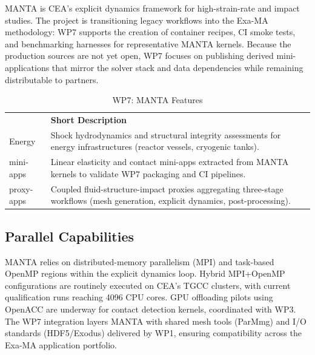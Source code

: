 MANTA is CEA's explicit dynamics framework for high-strain-rate and impact studies. The project is transitioning legacy
workflows into the Exa-MA methodology: WP7 supports the creation of container recipes, CI smoke tests, and benchmarking harnesses
for representative MANTA kernels. Because the production sources are not yet open, WP7 focuses on publishing derived
mini-applications that mirror the solver stack and data dependencies while remaining distributable to partners.

\begin{table}[h!]
    \centering
    { 
        \setlength{\parindent}{0pt}
        \def\arraystretch{1.25}
        {
            \fontsize{9}{11}\selectfont
            \begin{tabular}{!{\color{numpexgray}\vrule}p{.25\linewidth}!{\color{numpexgray}\vrule}p{.6885\linewidth}!{\color{numpexgray}\vrule}}
    
     &  {\rule{0pt}{2.5ex}\color{white}\bf Short Description }\\ 
    
    Energy & Shock hydrodynamics and structural integrity assessments for energy infrastructures (reactor vessels, cryogenic tanks). \\
    mini-apps & Linear elasticity and contact mini-apps extracted from MANTA kernels to validate WP7 packaging and CI pipelines. \\
    proxy-apps & Coupled fluid-structure-impact proxies aggregating three-stage workflows (mesh generation, explicit dynamics, post-processing). \\
\end{tabular}
        }
    }
    \caption{WP7: MANTA Features}
\end{table}


\subsection{Parallel Capabilities}
\label{sec:WP7:MANTA:performances}


MANTA relies on distributed-memory parallelism (MPI) and task-based OpenMP regions within the explicit dynamics loop. Hybrid
MPI+OpenMP configurations are routinely executed on CEA's TGCC clusters, with current qualification runs reaching 4096 CPU cores.
GPU offloading pilots using OpenACC are underway for contact detection kernels, coordinated with WP3. The WP7 integration layers
MANTA with shared mesh tools (ParMmg) and I/O standards (HDF5/Exodus) delivered by WP1, ensuring compatibility across the
Exa-MA application portfolio.


